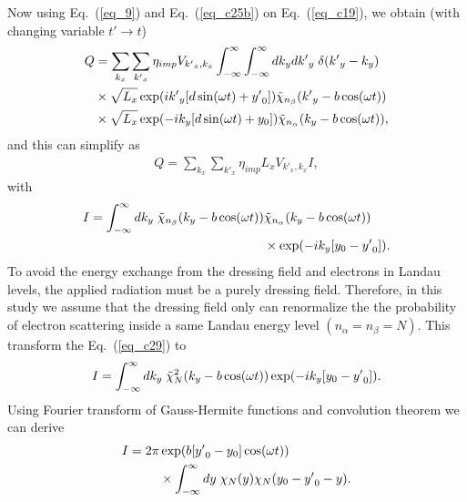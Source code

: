 Now using Eq.~(\ref{eq_9}) and Eq.~(\ref{eq_c25b}) on Eq.~(\ref{eq_c19}), we obtain (with changing variable $t' \rightarrow t$)
\begin{equation} \label{eq_c27}
  \begin{aligned}
    Q & =
    \sum_{k_x}\sum_{{k'}_x}
    {\eta_{imp} V_{{k'}_x,k_x}}
    \int_{-\infty}^{\infty} \int_{-\infty}^{\infty} dk_y d{k'}_y \;
    \delta({k'}_y - k_y)
    \\
    & \times
    \sqrt{L_x}
    \exp(
      i{k'}_y  \qty[d\sin(\omega t) + {y'}_0]
    )
    \tilde{\chi}_{n_{\beta}}\qty({k'}_y -b\cos(\omega t))
    \\
    & \times
    \sqrt{L_x}
    \exp(
      -ik_y  \qty[d\sin(\omega t) + y_0]
    )
    \tilde{\chi}_{n_{\alpha}}\qty(k_y -b\cos(\omega t)),
  \end{aligned}
\end{equation}
and this can simplify as
\begin{equation} \label{eq_c28}
  \begin{aligned}
    Q =
    \sum_{k_x}\sum_{{k'}_x}
    {\eta_{imp} L_x V_{{k'}_x,k_x}} I,
  \end{aligned}
\end{equation}
with
\begin{equation} \label{eq_c29}
  \begin{aligned}
    I =
    \int_{-\infty}^{\infty} dk_y \;
    \tilde{\chi}_{n_{\beta}}\qty(k_y -b\cos(\omega t)) &
    \tilde{\chi}_{n_{\alpha}}\qty(k_y -b\cos(\omega t)) \\
    & \times
    \exp(
      -ik_y  \qty[y_0 - {y'}_0  ]
    ).
  \end{aligned}
\end{equation}
To avoid the energy exchange from the dressing field and electrons in Landau levels, the applied radiation must be a purely dressing field.
Therefore, in this study we assume that the dressing field only can renormalize the the probability of electron scattering inside a same Landau energy level $(n_{\alpha} = n_{\beta} =N)$. This transform the Eq.~(\ref{eq_c29}) to
\begin{equation} \label{eq_c30}
    I =
    \int_{-\infty}^{\infty} dk_y \;
    \tilde{\chi}_{N}^2 \qty(k_y -b\cos(\omega t))
    \exp(
      -ik_y  \qty[y_0 - {y'}_0  ]
    ).
\end{equation}
Using Fourier transform of Gauss-Hermite functions \cite{celeghini21} and convolution theorem \cite{arfken85,bracewell78} we can derive
\begin{equation} \label{eq_c31}
  \begin{aligned}
    I =
    {2\pi} &
    \exp(b[{y'}_0 - y_0]\cos(\omega t)) \\
    & \times
    \int_{-\infty}^{\infty} dy \;
    {\chi}_{N}\qty(y)
    {\chi}_{N}\qty(y_0 - {y'}_0 - y).
  \end{aligned}
\end{equation}
